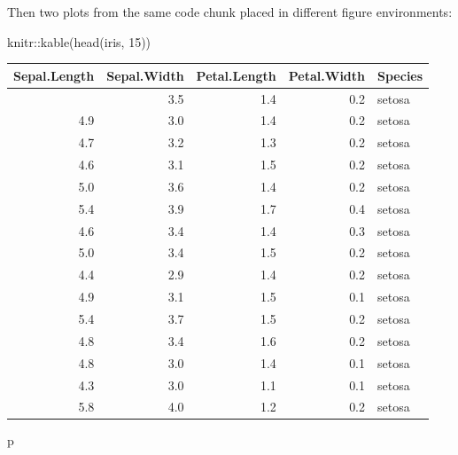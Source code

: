\documentclass[]{tufte-handout}
\newenvironment{Shaded}{}{}
\newcommand{\DecValTok}[1]{\textcolor[rgb]{0.25,0.63,0.44}{#1}}
\newcommand{\FunctionTok}[1]{\textcolor[rgb]{0.02,0.16,0.49}{#1}}
\newcommand{\NormalTok}[1]{#1}
\newcommand{\SpecialCharTok}[1]{\textcolor[rgb]{0.25,0.44,0.63}{#1}}
\begin{document}
Then two plots from the same code chunk placed in different figure
environments:

\begin{Shaded}
\begin{Highlighting}[]
\NormalTok{knitr}\SpecialCharTok{::}\FunctionTok{kable}\NormalTok{(}\FunctionTok{head}\NormalTok{(iris, }\DecValTok{15}\NormalTok{))}
\end{Highlighting}
\end{Shaded}

\begin{longtable}[]{@{}rrrrl@{}}
\toprule\noalign{}
Sepal.Length & Sepal.Width & Petal.Length & Petal.Width & Species \\
\midrule\noalign{}
\endhead
\bottomrule\noalign{}
\endlastfoot
5.1 & 3.5 & 1.4 & 0.2 & setosa \\
4.9 & 3.0 & 1.4 & 0.2 & setosa \\
4.7 & 3.2 & 1.3 & 0.2 & setosa \\
4.6 & 3.1 & 1.5 & 0.2 & setosa \\
5.0 & 3.6 & 1.4 & 0.2 & setosa \\
5.4 & 3.9 & 1.7 & 0.4 & setosa \\
4.6 & 3.4 & 1.4 & 0.3 & setosa \\
5.0 & 3.4 & 1.5 & 0.2 & setosa \\
4.4 & 2.9 & 1.4 & 0.2 & setosa \\
4.9 & 3.1 & 1.5 & 0.1 & setosa \\
5.4 & 3.7 & 1.5 & 0.2 & setosa \\
4.8 & 3.4 & 1.6 & 0.2 & setosa \\
4.8 & 3.0 & 1.4 & 0.1 & setosa \\
4.3 & 3.0 & 1.1 & 0.1 & setosa \\
5.8 & 4.0 & 1.2 & 0.2 & setosa \\
\end{longtable}

\begin{Shaded}
\begin{Highlighting}[]
\NormalTok{p}
\end{Highlighting}
\end{Shaded}
\end{document}
